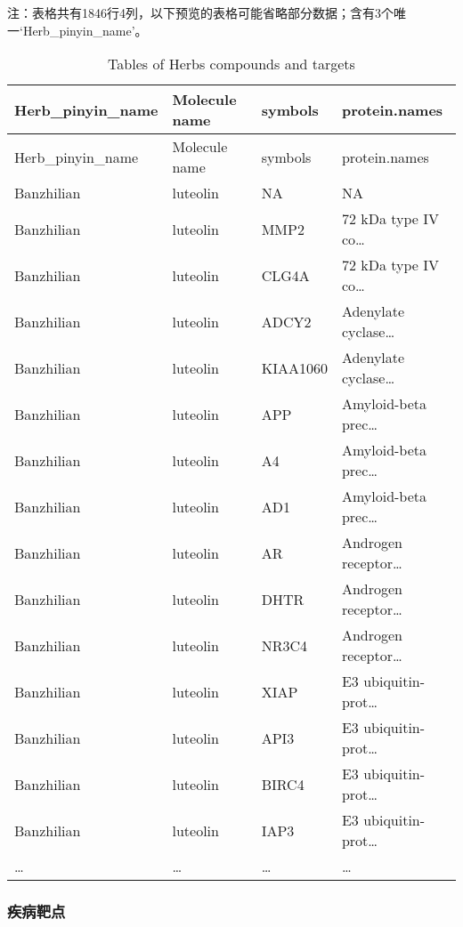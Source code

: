 \documentclass[
]{article}
\begin{document}
\begin{center}\begin{tcolorbox}[colback=gray!10, colframe=gray!50, width=0.9\linewidth, arc=1mm, boxrule=0.5pt]注：表格共有1846行4列，以下预览的表格可能省略部分数据；含有3个唯一`Herb\_pinyin\_name'。
\end{tcolorbox}
\end{center}

\begin{longtable}[]{@{}llll@{}}
\caption{\label{tab:tables-of-Herbs-compounds-and-targets}Tables of Herbs compounds and targets}\tabularnewline
\toprule
Herb\_pinyin\_name & Molecule name & symbols & protein.names\tabularnewline
\midrule
\endfirsthead
\toprule
Herb\_pinyin\_name & Molecule name & symbols & protein.names\tabularnewline
\midrule
\endhead
Banzhilian & luteolin & NA & NA\tabularnewline
Banzhilian & luteolin & MMP2 & 72 kDa type IV co\ldots{}\tabularnewline
Banzhilian & luteolin & CLG4A & 72 kDa type IV co\ldots{}\tabularnewline
Banzhilian & luteolin & ADCY2 & Adenylate cyclase\ldots{}\tabularnewline
Banzhilian & luteolin & KIAA1060 & Adenylate cyclase\ldots{}\tabularnewline
Banzhilian & luteolin & APP & Amyloid-beta prec\ldots{}\tabularnewline
Banzhilian & luteolin & A4 & Amyloid-beta prec\ldots{}\tabularnewline
Banzhilian & luteolin & AD1 & Amyloid-beta prec\ldots{}\tabularnewline
Banzhilian & luteolin & AR & Androgen receptor\ldots{}\tabularnewline
Banzhilian & luteolin & DHTR & Androgen receptor\ldots{}\tabularnewline
Banzhilian & luteolin & NR3C4 & Androgen receptor\ldots{}\tabularnewline
Banzhilian & luteolin & XIAP & E3 ubiquitin-prot\ldots{}\tabularnewline
Banzhilian & luteolin & API3 & E3 ubiquitin-prot\ldots{}\tabularnewline
Banzhilian & luteolin & BIRC4 & E3 ubiquitin-prot\ldots{}\tabularnewline
Banzhilian & luteolin & IAP3 & E3 ubiquitin-prot\ldots{}\tabularnewline
\ldots{} & \ldots{} & \ldots{} & \ldots{}\tabularnewline
\bottomrule
\end{longtable}

\begin{center}\vspace{1.5cm}\end{center}

\hypertarget{ux75beux75c5ux9776ux70b9}{%
\subsubsection{疾病靶点}\label{ux75beux75c5ux9776ux70b9}}
\end{document}
